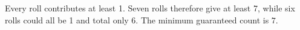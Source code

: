 Every roll contributes at least 1. Seven rolls therefore give at least 7, while six rolls could all be 1 and total only 6. The minimum guaranteed count is $\boxed7 $.
